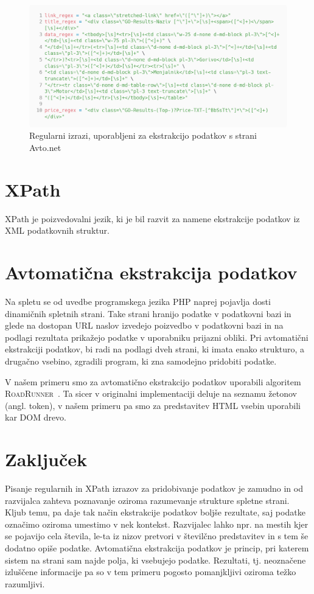 \documentclass[conference]{IEEEtran}
\begin{document}
	\begin{figure}
		\centering
		\includegraphics[width=0.9\linewidth]{images/avtonet_regex}
		\caption{Regularni izrazi, uporabljeni za ekstrakcijo podatkov s strani Avto.net}
		\label{fig:avtonet-regex}
	\end{figure}

	\section{XPath}
	
	XPath je poizvedovalni jezik, ki je bil razvit za namene ekstrakcije podatkov iz XML podatkovnih struktur.
	
	\section{Avtomatična ekstrakcija podatkov}
	
	Na spletu se od uvedbe programskega jezika PHP naprej pojavlja dosti dinamičnih spletnih strani. Take strani hranijo podatke v podatkovni bazi in glede na dostopan URL naslov izvedejo poizvedbo v podatkovni bazi in na podlagi rezultata prikažejo podatke v uporabniku prijazni obliki. Pri avtomatični ekstrakciji podatkov, bi radi na podlagi dveh strani, ki imata enako strukturo, a drugačno vsebino, zgradili program, ki zna samodejno pridobiti podatke.
	
	V našem primeru smo za avtomatično ekstrakcijo podatkov uporabili algoritem \textsc{RoadRunner}~\cite{roadrunner, crescenzi2001automatic}. Ta sicer v originalni implementaciji deluje na seznamu žetonov (angl. token), v našem primeru pa smo za predstavitev HTML vsebin uporabili kar DOM drevo.
	
	\section{Zaključek}
	
	Pisanje regularnih in XPath izrazov za pridobivanje podatkov je zamudno in od razvijalca zahteva poznavanje oziroma razumevanje strukture spletne strani. Kljub temu, pa daje tak način ekstrakcije podatkov boljše rezultate, saj podatke označimo oziroma umestimo v nek kontekst. Razvijalec lahko npr. na mestih kjer se pojavijo cela števila, le-ta iz nizov pretvori v številčno predstavitev in s tem še dodatno opiše podatke. Avtomatična ekstrakcija podatkov je princip, pri katerem sistem na strani sam najde polja, ki vsebujejo podatke. Rezultati, tj. neoznačene izluščene informacije pa so v tem primeru pogosto pomanjkljivi oziroma težko razumljivi.
	
\end{document}
